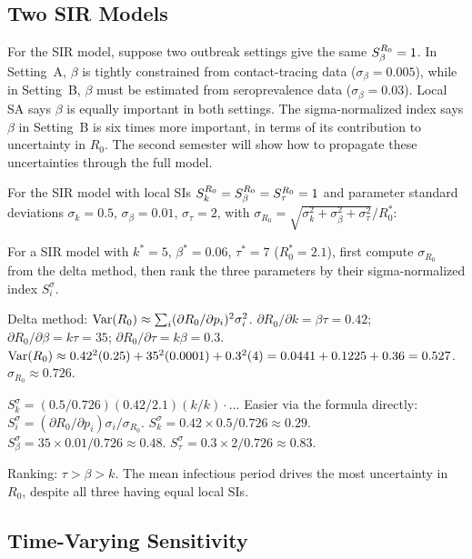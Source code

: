 \subsection{Two SIR Models}

For the SIR model, suppose two outbreak settings give the same
$S_{\beta}^{R_0} = 1$. In Setting~A, $\beta$ is tightly constrained
from contact-tracing data ($\sigma_\beta = 0.005$), while in Setting~B,
$\beta$ must be estimated from seroprevalence data ($\sigma_\beta = 0.03$).
Local SA says $\beta$ is equally important in both settings.
The sigma-normalized index says $\beta$ in Setting~B is six times more
important, in terms of its contribution to uncertainty in $R_0$.
The second semester will show how to propagate these uncertainties
through the full model.

\begin{selfcheck}
For the SIR model with local SIs $S_{k}^{R_0} = S_{\beta}^{R_0} = S_{\tau}^{R_0} = 1$
and parameter standard deviations $\sigma_k = 0.5$, $\sigma_\beta = 0.01$,
$\sigma_\tau = 2$, with $\sigma_{R_0} = \sqrt{\sigma_k^2 + \sigma_\beta^2 + \sigma_\tau^2}/R_0^*$:

For a SIR model with $k^* = 5$, $\beta^* = 0.06$, $\tau^* = 7$
($R_0^* = 2.1$), first compute $\sigma_{R_0}$ from the delta method, then
rank the three parameters by their sigma-normalized index $S_i^\sigma$.
\end{selfcheck}
\begin{scAnswer}
Delta method: $\operatorname{Var}(R_0) \approx \sum_i (\partial R_0/\partial p_i)^2\sigma_i^2$.
$\partial R_0/\partial k = \beta\tau = 0.42$; $\partial R_0/\partial\beta = k\tau = 35$;
$\partial R_0/\partial\tau = k\beta = 0.3$.
$\operatorname{Var}(R_0) \approx 0.42^2(0.25) + 35^2(0.0001) + 0.3^2(4)
= 0.0441 + 0.1225 + 0.36 = 0.527$.
$\sigma_{R_0} \approx 0.726$.

$S_k^\sigma = (0.5/0.726)(0.42/2.1)(k/k)\cdot$... Easier via the formula directly:
$S_i^\sigma = (\partial R_0/\partial p_i)\sigma_i/\sigma_{R_0}$.
$S_k^\sigma = 0.42 \times 0.5/0.726 \approx 0.29$.
$S_\beta^\sigma = 35 \times 0.01/0.726 \approx 0.48$.
$S_\tau^\sigma = 0.3 \times 2/0.726 \approx 0.83$.

Ranking: $\tau > \beta > k$. The mean infectious period drives the most
uncertainty in $R_0$, despite all three having equal local SIs.
\end{scAnswer}

\subsection{Time-Varying Sensitivity}
\label{sec:timevarying}

